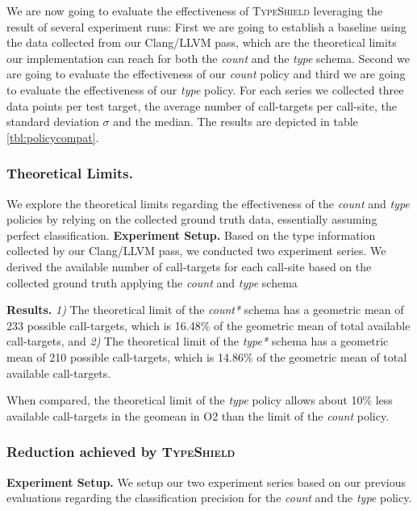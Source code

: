 We are now going to evaluate the effectiveness of \textsc{TypeShield} leveraging the result of several experiment runs: First we are going to establish a baseline using the data 
collected from our Clang/LLVM pass, which are the theoretical limits our implementation can reach for both the \textit{count} and the \textit{type} schema. Second we are going to evaluate the effectiveness of our \textit{count} 
policy and third we are going to evaluate the effectiveness of our \textit{type} policy. For each series we collected three data points per test target, the average number of call-targets per call-site, the standard deviation $\sigma$ and the median. The results are depicted in table \ref{tbl:policycompat}. 

\subsubsection{Theoretical Limits.}
\label{subsection:theoreticallimit}
We explore the theoretical limits regarding the effectiveness of the \textit{count} and \textit{type} policies by relying on the collected ground truth data, essentially assuming perfect classification.
\textbf{Experiment Setup.} Based on the type information collected by our Clang/LLVM pass, we conducted two experiment series.
We derived the available number of call-targets for each call-site based on the collected ground truth applying the \textit{count} and \textit{type} schema

\textbf{Results.}
\textit{1)} The theoretical limit of the \textit{count*} schema has a geometric mean of 233 possible call-targets, which is 16.48\% of the geometric mean of total available 
call-targets, and
\textit{2)} The theoretical limit of the \textit{type*} schema has a geometric mean of 210 possible call-targets, which is 14.86\% of the geometric mean of total available
call-targets.

When compared, the theoretical limit of the \textit{type} policy allows about 10\% less available call-targets in the geomean in O2 than the limit of the \textit{count} policy.

\subsubsection{Reduction achieved by \textsc{TypeShield}}
\label{subsection:typeshieldvslimitcount}
\textbf{Experiment Setup.} We setup our two experiment series based on our previous evaluations regarding the classification precision for the \textit{count} and the \textit{type} policy.

